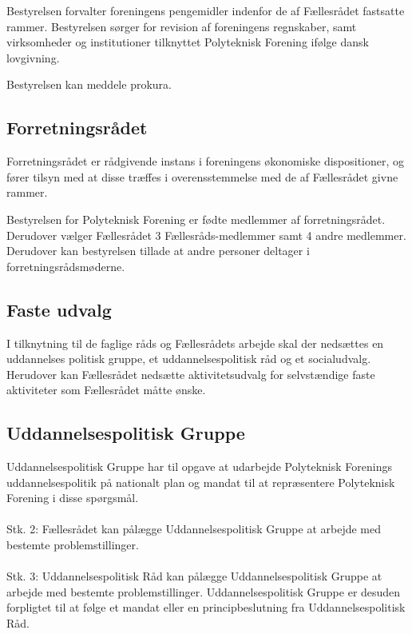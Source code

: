 \begin{list}
\item Bestyrelsen forvalter foreningens pengemidler indenfor de af Fællesrådet fastsatte rammer. Bestyrelsen sørger for revision af foreningens regnskaber, samt virksomheder og institutioner tilknyttet Polyteknisk Forening ifølge dansk lovgivning.

\item Bestyrelsen kan meddele prokura.


\subsection{Forretningsrådet}
\label{kapL:FRR}
\item Forretningsrådet er rådgivende instans i foreningens økonomiske dispositioner, og fører tilsyn med at disse træffes i overensstemmelse med de af Fællesrådet givne rammer.

\item Bestyrelsen for Polyteknisk Forening er fødte medlemmer af forretningsrådet. Derudover vælger Fællesrådet 3 Fællesråds-medlemmer samt 4 andre medlemmer. Derudover kan bestyrelsen tillade at andre personer deltager i forretningsrådsmøderne.

\subsection{Faste udvalg}
\label{kapL:fasteUdvalg}
\item I tilknytning til de faglige råds og Fællesrådets arbejde skal der nedsættes en uddannelses politisk gruppe, et uddannelsespolitisk råd og et socialudvalg. Herudover kan Fællesrådet nedsætte aktivitetsudvalg for selvstændige faste aktiviteter som Fællesrådet måtte ønske.

\subsection{Uddannelsespolitisk Gruppe}
\label{kapL:UPG}
\item Uddannelsespolitisk Gruppe har til opgave at udarbejde Polyteknisk Forenings uddannelsespolitik på nationalt plan og mandat til at repræsentere Polyteknisk Forening i disse spørgsmål.
\\
\\
Stk. 2: Fællesrådet kan pålægge Uddannelsespolitisk Gruppe at arbejde med bestemte problemstillinger.
\\
\\
Stk. 3: Uddannelsespolitisk Råd kan pålægge Uddannelsespolitisk Gruppe at arbejde med bestemte problemstillinger. Uddannelsespolitisk Gruppe er desuden forpligtet til at følge et mandat eller en principbeslutning fra Uddannelsespolitisk Råd.



\end{list}
